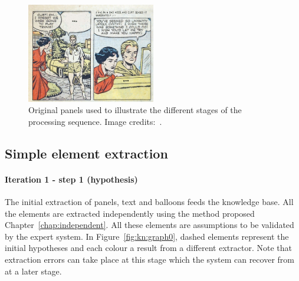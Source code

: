 \begin{figure}[!h]  %
\centering
\includegraphics[width=0.5\textwidth]{process_illustration.jpg}
\caption[Original panels used to illustrate the different stages of the processing sequence]{Original panels used to illustrate the different stages of the processing sequence. Image credits:~\cite{Jay53}.}
\label{fig:casesExampleReconnaissance}
\end{figure}

\subsection{Simple element extraction} %
\label{sub:simple_element_extraction}

\paragraph{Iteration 1 - step 1 (hypothesis)} %
\label{par:step_1}
The initial extraction of panels, text and balloons feeds the knowledge base.
All the elements are extracted independently using the method proposed Chapter~\ref{chap:independent}.
All these elements are assumptions to be validated by the expert system.
In Figure~\ref{fig:kn:graph0}, dashed elements represent the initial hypotheses and each colour a result from a different extractor.
Note that extraction errors can take place at this stage which the system can recover from at a later stage.


